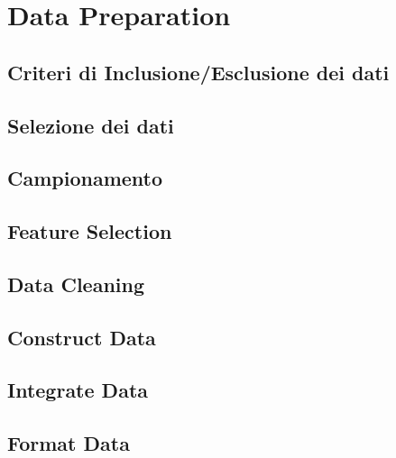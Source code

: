 \section{Data Preparation}

\subsection{Criteri di Inclusione/Esclusione dei dati}

\subsection{Selezione dei dati}

\subsection{Campionamento}

\subsection{Feature Selection}

\subsection{Data Cleaning}

\subsection{Construct Data}

\subsection{Integrate Data}

\subsection{Format Data}

